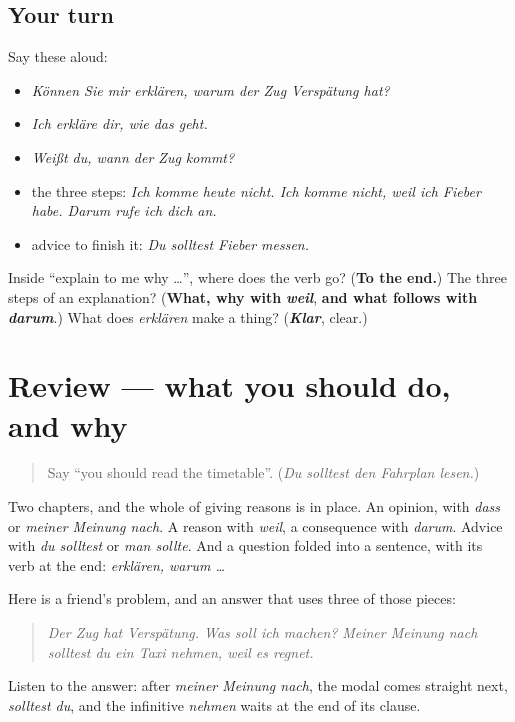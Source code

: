 \subsection*{Your turn}
Say these aloud:

\begin{itemize}
\raggedright
  \item \emph{Können Sie mir erklären, warum der Zug Verspätung hat?}
  \item \emph{Ich erkläre dir, wie das geht.}
  \item \emph{Weißt du, wann der Zug kommt?}
  \item the three steps: \emph{Ich komme heute nicht. Ich komme nicht, weil ich Fieber habe. Darum rufe ich dich an.}
  \item advice to finish it: \emph{Du solltest Fieber messen.}
\end{itemize}

\begin{tcolorbox}[breakable,colback=teal!4,colframe=teal!35!black,title={Before you move on}]
Inside \textquotedblleft{}explain to me why …\textquotedblright{}, where does the verb go? (\textbf{To the end.}) The three steps of an explanation? (\textbf{What, why with} \emph{\textbf{weil}}, \textbf{and what follows with} \emph{\textbf{darum}}.) What does \emph{erklären} make a thing? (\emph{\textbf{Klar}}, clear.)
\end{tcolorbox}
\section[(review)]{Review — what you should do, and why}

\label{lesson:GE-C255-review}



\begin{quote}
Say \textquotedblleft{}you should read the timetable\textquotedblright{}. (\emph{Du solltest den Fahrplan lesen.})
\end{quote}

\begin{grammarlens}[title={What you've built}]
Two chapters, and the whole of giving reasons is in place. An opinion, with \emph{dass} or \emph{meiner Meinung nach}. A reason with \emph{weil}, a consequence with \emph{darum}. Advice with \emph{du solltest} or \emph{man sollte}. And a question folded into a sentence, with its verb at the end: \emph{erklären, warum …}

Here is a friend's problem, and an answer that uses three of those pieces:

\begin{quote}
\emph{Der Zug hat Verspätung. Was soll ich machen?} \emph{Meiner Meinung nach solltest du ein Taxi nehmen, weil es regnet.}
\end{quote}

Listen to the answer: after \emph{meiner Meinung nach}, the modal comes straight next, \emph{solltest du}, and the infinitive \emph{nehmen} waits at the end of its clause.
\end{grammarlens}

